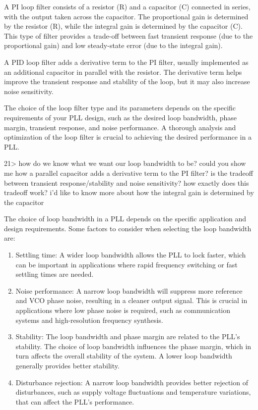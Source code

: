 \documentclass[
]{article}
\begin{document}
A PI loop filter consists of a resistor (R) and a capacitor (C)
connected in series, with the output taken across the capacitor. The
proportional gain is determined by the resistor (R), while the integral
gain is determined by the capacitor (C). This type of filter provides a
trade-off between fast transient response (due to the proportional gain)
and low steady-state error (due to the integral gain).

A PID loop filter adds a derivative term to the PI filter, usually
implemented as an additional capacitor in parallel with the resistor.
The derivative term helps improve the transient response and stability
of the loop, but it may also increase noise sensitivity.

The choice of the loop filter type and its parameters depends on the
specific requirements of your PLL design, such as the desired loop
bandwidth, phase margin, transient response, and noise performance. A
thorough analysis and optimization of the loop filter is crucial to
achieving the desired performance in a PLL.

21\textgreater{} how do we know what we want our loop bandwidth to be?
could you show me how a parallel capacitor adds a derivative term to the
PI filter? is the tradeoff between transient response/stability and
noise sensitivity? how exactly does this tradeoff work? i'd like to know
more about how the integral gain is determined by the capacitor

The choice of loop bandwidth in a PLL depends on the specific
application and design requirements. Some factors to consider when
selecting the loop bandwidth are:

\begin{enumerate}
\def\labelenumi{\arabic{enumi}.}
\item
  Settling time: A wider loop bandwidth allows the PLL to lock faster,
  which can be important in applications where rapid frequency switching
  or fast settling times are needed.
\item
  Noise performance: A narrow loop bandwidth will suppress more
  reference and VCO phase noise, resulting in a cleaner output signal.
  This is crucial in applications where low phase noise is required,
  such as communication systems and high-resolution frequency synthesis.
\item
  Stability: The loop bandwidth and phase margin are related to the
  PLL's stability. The choice of loop bandwidth influences the phase
  margin, which in turn affects the overall stability of the system. A
  lower loop bandwidth generally provides better stability.
\item
  Disturbance rejection: A narrow loop bandwidth provides better
  rejection of disturbances, such as supply voltage fluctuations and
  temperature variations, that can affect the PLL's performance.
\end{enumerate}
\end{document}

